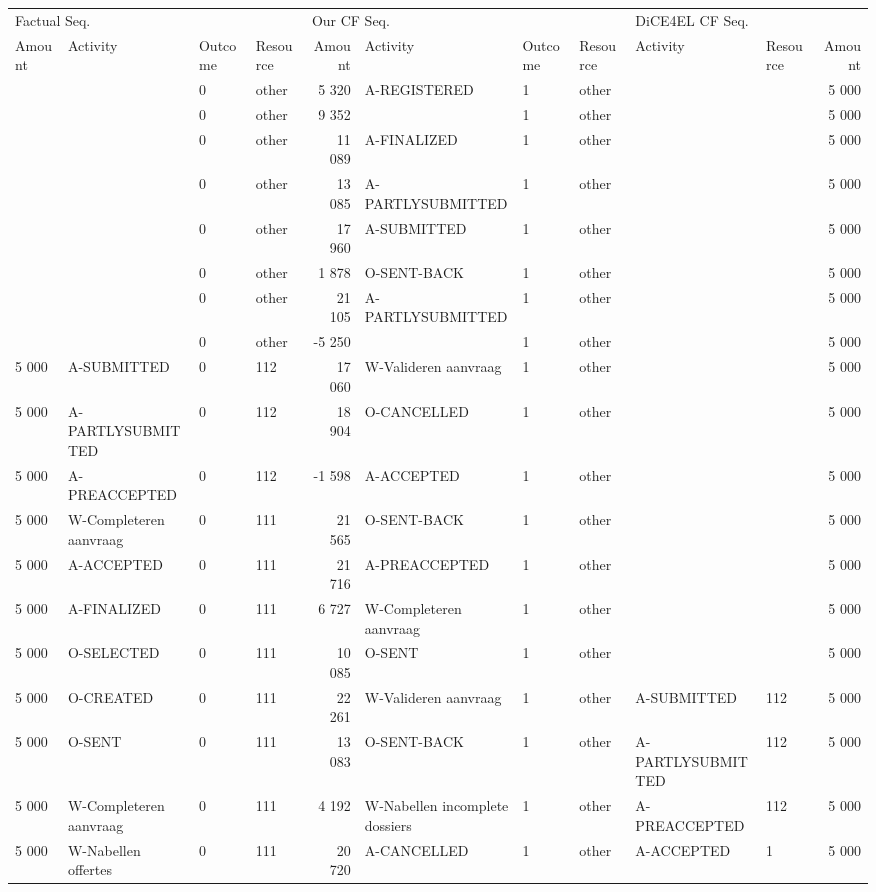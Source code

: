 \begin{tabular}{llllrlllllr}
\toprule
\multicolumn{4}{l}{Factual Seq.} & \multicolumn{4}{l}{Our CF Seq.} & \multicolumn{3}{l}{DiCE4EL CF Seq.} \\
Amount & Activity & Outcome & Resource & Amount & Activity & Outcome & Resource & Activity & Resource & Amount \\
\midrule
 &  & 0 & other & 5 320 & A-REGISTERED & 1 & other &  &  & 5 000 \\
 &  & 0 & other & 9 352 &  & 1 & other &  &  & 5 000 \\
 &  & 0 & other & 11 089 & A-FINALIZED & 1 & other &  &  & 5 000 \\
 &  & 0 & other & 13 085 & A-PARTLYSUBMITTED & 1 & other &  &  & 5 000 \\
 &  & 0 & other & 17 960 & A-SUBMITTED & 1 & other &  &  & 5 000 \\
 &  & 0 & other & 1 878 & O-SENT-BACK & 1 & other &  &  & 5 000 \\
 &  & 0 & other & 21 105 & A-PARTLYSUBMITTED & 1 & other &  &  & 5 000 \\
 &  & 0 & other & -5 250 &  & 1 & other &  &  & 5 000 \\
5 000 & A-SUBMITTED & 0 & 112 & 17 060 & W-Valideren aanvraag & 1 & other &  &  & 5 000 \\
5 000 & A-PARTLYSUBMITTED & 0 & 112 & 18 904 & O-CANCELLED & 1 & other &  &  & 5 000 \\
5 000 & A-PREACCEPTED & 0 & 112 & -1 598 & A-ACCEPTED & 1 & other &  &  & 5 000 \\
5 000 & W-Completeren aanvraag & 0 & 111 & 21 565 & O-SENT-BACK & 1 & other &  &  & 5 000 \\
5 000 & A-ACCEPTED & 0 & 111 & 21 716 & A-PREACCEPTED & 1 & other &  &  & 5 000 \\
5 000 & A-FINALIZED & 0 & 111 & 6 727 & W-Completeren aanvraag & 1 & other &  &  & 5 000 \\
5 000 & O-SELECTED & 0 & 111 & 10 085 & O-SENT & 1 & other &  &  & 5 000 \\
5 000 & O-CREATED & 0 & 111 & 22 261 & W-Valideren aanvraag & 1 & other & A-SUBMITTED & 112 & 5 000 \\
5 000 & O-SENT & 0 & 111 & 13 083 & O-SENT-BACK & 1 & other & A-PARTLYSUBMITTED & 112 & 5 000 \\
5 000 & W-Completeren aanvraag & 0 & 111 & 4 192 & W-Nabellen incomplete dossiers & 1 & other & A-PREACCEPTED & 112 & 5 000 \\
5 000 & W-Nabellen offertes & 0 & 111 & 20 720 & A-CANCELLED & 1 & other & A-ACCEPTED & 1 & 5 000 \\

\end{tabular}

